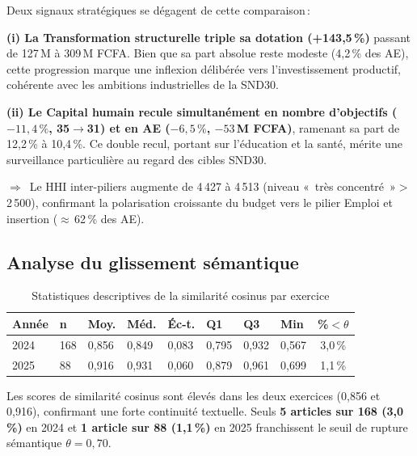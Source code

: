 \documentclass[12pt, a4paper]{article}
\begin{document}
Deux signaux stratégiques se dégagent de cette comparaison\,: 

\textbf{(i) La Transformation structurelle triple sa dotation (+143,5\,\%)} passant de 127\,M à 309\,M FCFA. 
Bien que sa part absolue reste modeste (4,2\,\% des AE), cette progression marque une inflexion 
délibérée vers l'investissement productif, cohérente avec les ambitions industrielles de la SND30.

\textbf{(ii) Le Capital humain recule simultanément en nombre d'objectifs ($-11{,}4\,\%$, 35$\to$31) 
et en AE ($-6{,}5\,\%$, $-53$\,M FCFA)}, ramenant sa part de 12,2\,\% à 10,4\,\%. Ce double recul, 
portant sur l'éducation et la santé, mérite une surveillance particulière au regard des cibles SND30.

\begin{alertbox}
\small $\Rightarrow$~Le HHI inter-piliers augmente de 4\,427 à 4\,513 (niveau «~très concentré~»$>$2\,500), 
confirmant la polarisation croissante du budget vers le pilier Emploi et insertion ($\approx$\,62\,\% des AE).
\end{alertbox}

\subsection{Analyse du glissement sémantique}

\begin{table}[H]
\centering
\caption{Statistiques descriptives de la similarité cosinus par exercice}
\label{tab:sim}
\small
\begin{tabularx}{\linewidth}{lXXXXXXXc}
\toprule
\rowcolor{bleuCMR!15}
\textbf{Année} & \textbf{n} & \textbf{Moy.} & \textbf{Méd.} & \textbf{Éc-t.} & \textbf{Q1} & \textbf{Q3} & \textbf{Min} & \textbf{\%$<\theta$} \\
\midrule
2024 & 168 & 0,856 & 0,849 & 0,083 & 0,795 & 0,932 & 0,567 & 3,0\,\% \\
2025 & 88  & 0,916 & 0,931 & 0,060 & 0,879 & 0,961 & 0,699 & 1,1\,\% \\
\bottomrule
\end{tabularx}
\end{table}

Les scores de similarité cosinus sont élevés dans les deux exercices (0,856 et 0,916), confirmant 
une forte continuité textuelle. Seuls \textbf{5 articles sur 168 (3,0\,\%)} en 2024 et 
\textbf{1 article sur 88 (1,1\,\%)} en 2025 franchissent le seuil de rupture sémantique $\theta = 0{,}70$.
\end{document}
